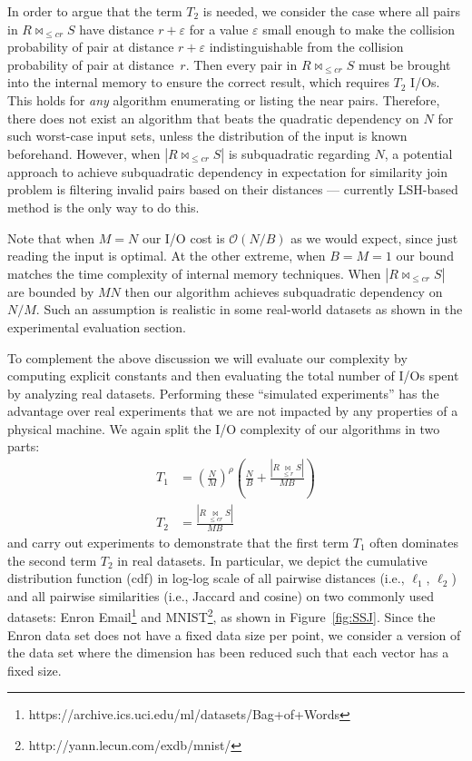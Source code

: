 \documentclass{llncs}
\newcommand{\Osymbol}{{\mathcal O}}
\newcommand{\BO}[1]{\Osymbol\left(#1\right)}
\newcommand{\ms}[1]{{#1}}
\begin{document}
In order to argue that the term $T_2$ is needed, we consider the case where all pairs in $R \bowtie_{\leq cr} S$ have distance $r+\varepsilon$ for a value $\varepsilon$ small enough to make the collision probability of pair at distance $r+\varepsilon$ indistinguishable from the collision probability of pair at distance~$r$.
Then every pair in $R \bowtie_{\leq cr} S$ must be brought into the internal memory to ensure the correct result, which requires $T_2$ I/Os. 
This holds for \emph{any} algorithm enumerating or listing the near pairs. 
Therefore, there does not exist an algorithm that beats the quadratic dependency on $N$ for such worst-case input sets, unless the distribution of the input is known beforehand. 
However, when $|R \bowtie_{\leq cr} S|$ is subquadratic regarding $N$, a potential approach to achieve subquadratic dependency in expectation for similarity join problem is filtering invalid pairs based on their distances --- currently LSH-based method is the only way to do this.

Note that when $M=N$ our I/O cost is $\BO{N/B}$ as we would expect, since just reading the input is optimal. 
At the other extreme, when $B=M=1$ our bound matches the time complexity of internal memory techniques. 
When $|R \bowtie_{\leq cr} S|$ are bounded by $MN$ then our algorithm achieves subquadratic dependency on $N/M$. 
Such an assumption is realistic in some real-world datasets as shown in the experimental evaluation section.



\smallskip

\ms{To complement the above discussion we will evaluate our complexity by computing explicit constants and then evaluating the total number of I/Os spent by analyzing real datasets. Performing these ``simulated experiments'' has the advantage over real experiments that we are not impacted by any properties of a physical machine.}
We again split the I/O complexity of our algorithms in two parts:
\begin{align*}
T_1 &= \left(\frac{N}{M}\right)^\rho \left( \frac{N}{B}+\frac{|R \underset{\leq r}{\bowtie} S|}{M B}\right)\\
T_2 &= \frac{|R \underset{\leq cr}{\bowtie} S|}{M B}
\end{align*}
and carry out experiments to demonstrate that the first term $T_1$ often dominates the second term $T_2$ in real datasets. 
In particular, we depict the cumulative distribution function (cdf) in log-log scale of all pairwise distances (i.e., $\ell_1$, $\ell_2$) and all pairwise similarities (i.e., Jaccard and cosine) on two commonly used datasets: Enron Email\footnote{https://archive.ics.uci.edu/ml/datasets/Bag+of+Words} and MNIST\footnote{http://yann.lecun.com/exdb/mnist/}, as shown in Figure~\ref{fig:SSJ}.
Since the Enron data set does not have a fixed data size per point, we consider a version of the data set where the dimension has been reduced such that each vector has a fixed size.
\end{document}
